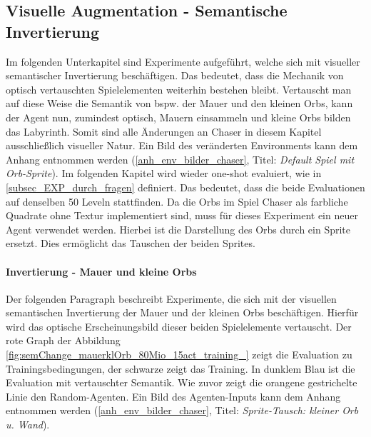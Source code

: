\subsection{Visuelle Augmentation - Semantische Invertierung}\label{absch_EXP_durch_serie2}
Im folgenden Unterkapitel sind Experimente aufgeführt, welche sich mit visueller semantischer Invertierung beschäftigen. Das bedeutet, dass die Mechanik von optisch vertauschten Spielelementen weiterhin bestehen bleibt. Vertauscht man auf diese Weise die Semantik von bspw. der Mauer und den kleinen Orbs, kann der Agent nun, zumindest optisch, Mauern einsammeln und kleine Orbs bilden das Labyrinth. Somit sind alle Änderungen an Chaser in diesem Kapitel ausschließlich visueller Natur. Ein Bild des veränderten Environments kann dem Anhang entnommen werden (\ref{anh_env_bilder_chaser}, Titel: \emph{Default Spiel mit Orb-Sprite}). Im folgenden Kapitel wird wieder one-shot evaluiert, wie in \ref{subsec_EXP_durch_fragen} definiert. Das bedeutet, dass die beide Evaluationen auf denselben 50 Leveln stattfinden. Da die Orbs im Spiel Chaser als farbliche Quadrate ohne Textur implementiert sind, muss für dieses Experiment ein neuer Agent verwendet werden. Hierbei ist die Darstellung des Orbs durch ein Sprite ersetzt. Dies ermöglicht das Tauschen der beiden Sprites. 

\paragraph{Invertierung - Mauer und kleine Orbs}
Der folgenden Paragraph beschreibt Experimente, die sich mit der visuellen semantischen Invertierung der Mauer und der kleinen Orbs beschäftigen. Hierfür wird das optische Erscheinungsbild dieser beiden Spielelemente vertauscht. Der rote Graph der Abbildung \ref{fig:semChange_mauerklOrb_80Mio_15act_training_} zeigt die Evaluation zu Trainingsbedingungen, der schwarze zeigt das Training. In dunklem Blau ist die Evaluation mit vertauschter Semantik. Wie zuvor zeigt die orangene gestrichelte Linie den Random-Agenten. 
Ein Bild des Agenten-Inputs kann dem Anhang entnommen werden (\ref{anh_env_bilder_chaser}, Titel: \emph{Sprite-Tausch: kleiner Orb u.
Wand}). 

